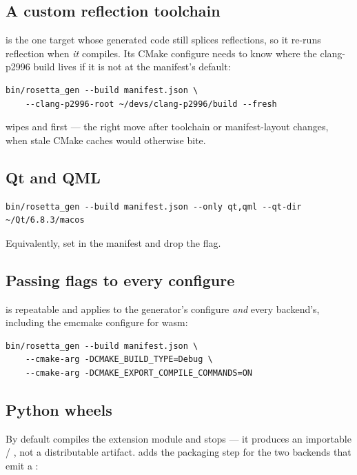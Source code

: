 \subsection{A custom reflection toolchain}

 is the one target whose generated code still splices reflections, so
it re-runs reflection when \emph{it} compiles. Its CMake configure needs to know
where the clang-p2996 build lives if it is not at the manifest's default:

\begin{lstlisting}[style=sh]
bin/rosetta_gen --build manifest.json \
    --clang-p2996-root ~/devs/clang-p2996/build --fresh
\end{lstlisting}

 wipes  and  first --- the right move
after toolchain or manifest-layout changes, when stale CMake caches would
otherwise bite.

\subsection{Qt and QML}

\begin{lstlisting}[style=sh]
bin/rosetta_gen --build manifest.json --only qt,qml --qt-dir ~/Qt/6.8.3/macos
\end{lstlisting}

Equivalently, set  in the manifest and drop the flag.

\subsection{Passing flags to every configure}

 is repeatable and applies to the generator's configure
\emph{and} every backend's, including the emcmake configure for wasm:

\begin{lstlisting}[style=sh]
bin/rosetta_gen --build manifest.json \
    --cmake-arg -DCMAKE_BUILD_TYPE=Debug \
    --cmake-arg -DCMAKE_EXPORT_COMPILE_COMMANDS=ON
\end{lstlisting}

\subsection{Python wheels}

By default  compiles the extension module and stops --- it
produces an importable  / , not a distributable artifact.
 adds the packaging step for the two backends that emit a
\code{make\_wheel.py}:

